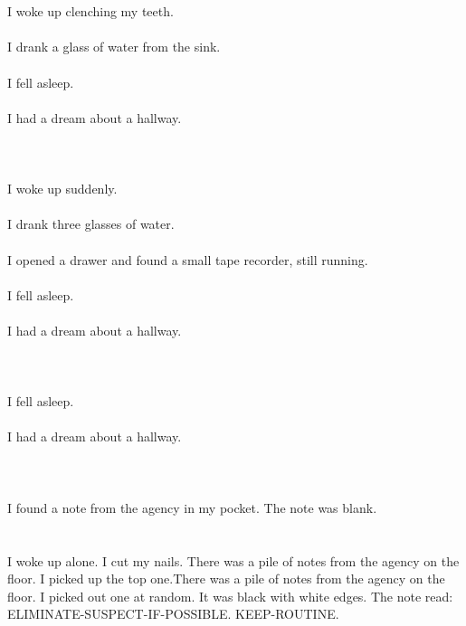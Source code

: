 \documentclass{article}
\begin{document}
    \section{}
    I woke up clenching my teeth.\\\\I drank a glass of water from the sink.\\\\I fell asleep.\\\\I had a dream about a hallway.\\\\ 
    \newpage
    
    \section{}
    I woke up suddenly.\\\\I drank three glasses of water.\\\\I opened a drawer and found a small tape recorder, still running.\\\\I fell asleep.\\\\I had a dream about a hallway.\\\\ 
    \newpage
    
    \section{}
    I fell asleep.\\\\I had a dream about a hallway.\\\\ 
    \newpage
    
    \section{}
    I found a note from the agency in my pocket. The note was blank.  
    \newpage
    
    \section{}
    I woke up alone. I cut my nails. There was a pile of notes from the agency on the floor. I picked up the top one.There was a pile of notes from the agency on the floor. I picked out one at random. It was black with white edges. The note read: ELIMINATE-SUSPECT-IF-POSSIBLE. KEEP-ROUTINE.  
    \newpage
    
\end{document}
